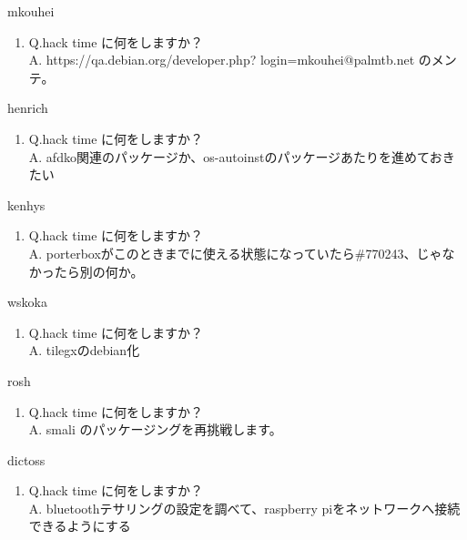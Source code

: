 \begin{prework}{ mkouhei }
  \begin{enumerate}
  \item Q.hack time に何をしますか？\\
    A. https://qa.debian.org/developer.php? login=mkouhei@palmtb.net のメンテ。
  \end{enumerate}
\end{prework}

\begin{prework}{ henrich }
  \begin{enumerate}
  \item Q.hack time に何をしますか？\\
    A. afdko関連のパッケージか、os-autoinstのパッケージあたりを進めておきたい
  \end{enumerate}
\end{prework}

\begin{prework}{ kenhys }
  \begin{enumerate}
  \item Q.hack time に何をしますか？\\
    A. porterboxがこのときまでに使える状態になっていたら\#770243、じゃなかったら別の何か。
  \end{enumerate}
\end{prework}

\begin{prework}{ wskoka }
  \begin{enumerate}
  \item Q.hack time に何をしますか？\\
    A. tilegxのdebian化
  \end{enumerate}
\end{prework}

\begin{prework}{ rosh }
  \begin{enumerate}
  \item Q.hack time に何をしますか？\\
    A. smali のパッケージングを再挑戦します。
  \end{enumerate}
\end{prework}

\begin{prework}{ dictoss }
  \begin{enumerate}
  \item Q.hack time に何をしますか？\\
    A. bluetoothテサリングの設定を調べて、raspberry piをネットワークへ接続できるようにする
  \end{enumerate}
\end{prework}

